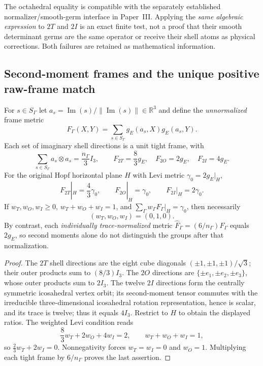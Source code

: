 \documentclass[11pt]{article}
\begin{document}
\begin{remark}
The octahedral equality is compatible with the separately established
normalizer/smooth-germ interface in Paper~III.  Applying the \emph{same
algebraic expression} to $2T$ and $2I$ is an exact finite test, not a
proof that their smooth determinant germs are the same operator or
receive their shell atoms as physical corrections.  Both failures are
retained as mathematical information.
\end{remark}

\subsection{Second-moment frames and the unique positive raw-frame match}
\label{p1b:subsec:v11-shell-frames}

\begin{theorem}
\label{p1b:thm:v11-three-shell-frames}
For $s\in S_\Gamma$ let
$a_s=\operatorname{Im}(s)/\|\operatorname{Im}(s)\|\in\mathbb R^3$
and define the \emph{unnormalized} frame metric
\[
 F_\Gamma(X,Y)=\sum_{s\in S_\Gamma}
  g_E(a_s,X)g_E(a_s,Y).
\]
Each set of imaginary shell directions is a unit tight frame, with
\[
 \sum_{s\in S_\Gamma}a_s\otimes a_s=\frac{n_\Gamma}{3}I_3,
 \qquad
\boxed{F_{2T}=\frac83g_E,\quad F_{2O}=2g_E,\quad
F_{2I}=4g_E.}
\]
For the original Hopf horizontal plane $H$ with Levi metric
$\gamma_0=2g_E|_H$,
\[
 F_{2T}|_H=\frac43\gamma_0,\qquad
 F_{2O}|_H=\gamma_0,\qquad
 F_{2I}|_H=2\gamma_0.
\]
If $w_T,w_O,w_I\ge0$, $w_T+w_O+w_I=1$, and
$\sum_\Gamma w_\Gamma F_\Gamma|_H=\gamma_0$, then necessarily
\[
\boxed{(w_T,w_O,w_I)=(0,1,0).}
\]
By contrast, each \emph{individually trace-normalized} metric
$\widehat F_\Gamma=(6/n_\Gamma)F_\Gamma$ equals $2g_E$,
so second moments alone do not distinguish the groups after that
normalization.
\end{theorem}
\begin{proof}
The $2T$ shell directions are the eight cube diagonals
$(\pm1,\pm1,\pm1)/\sqrt3$; their outer products sum to
$(8/3)I_3$.  The $2O$ directions are $\{\pm e_1,\pm e_2,\pm e_3\}$,
whose outer products sum to $2I_3$.  The twelve $2I$ directions form
the centrally symmetric icosahedral vertex orbit; its second-moment
tensor commutes with the irreducible three-dimensional icosahedral
rotation representation, hence is scalar, and its trace is twelve;
thus it equals $4I_3$.  Restrict to $H$ to obtain the displayed
ratios.  The weighted Levi condition reads
\[
 \frac83 w_T+2w_O+4w_I=2,
 \qquad w_T+w_O+w_I=1,
\]
so $\frac23w_T+2w_I=0$.  Nonnegativity forces
$w_T=w_I=0$ and $w_O=1$.  Multiplying each tight frame by
$6/n_\Gamma$ proves the last assertion.
\end{proof}
\end{document}
